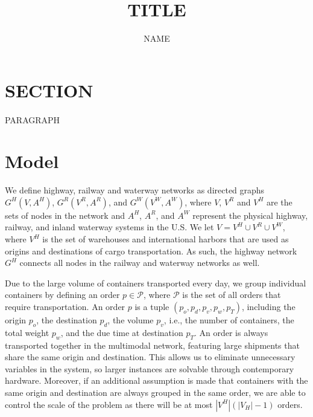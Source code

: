 \documentclass[12pt]{article}
\title{TITLE}
\author{NAME}
\date{}
\numberwithin{equation}{section}
\begin{document}
\maketitle

\section{SECTION}

	\paragraph{}PARAGRAPH

\section{Model}

	We define highway, railway and waterway networks as directed graphs $G^H(V, A^H)$, $G^R(V^R, A^R)$, and $G^W(V^W, A^W)$, where $V$, $V^R$ and $V^H$ are the sets of nodes in the network and $A^H$, $A^R$, and $A^W$ represent the physical highway, railway, and inland waterway systems in the U.S. We let $V=V^H\cup V^R\cup V^W$, where $V^H$ is the set of warehouses and international harbors that are used as origins and destinations of cargo transportation. As such, the highway network $G^H$ connects all nodes in the railway and waterway networks as well.
	
	Due to the large volume of containers transported every day, we group individual containers by defining an order $p\in\mathcal{P}$, where $\mathcal{P}$ is the set of all orders that require transportation. An order $p$ is a tuple $(p_o, p_d, p_v, p_w, p_T)$, including the origin $p_o$, the destination $p_d$, the volume $p_v$, i.e., the number of containers, the total weight $p_w$, and the due time at destination $p_T$. An order is always transported together in the multimodal network, featuring large shipments that share the same origin and destination. This allows us to eliminate unnecessary variables in the system, so larger instances are solvable through contemporary hardware. Moreover, if an additional assumption is made that containers with the same origin and destination are always grouped in the same order, we are able to control the scale of the problem as there will be at most $|V^H|(|V_H| - 1)$ orders.
	
\end{document}
